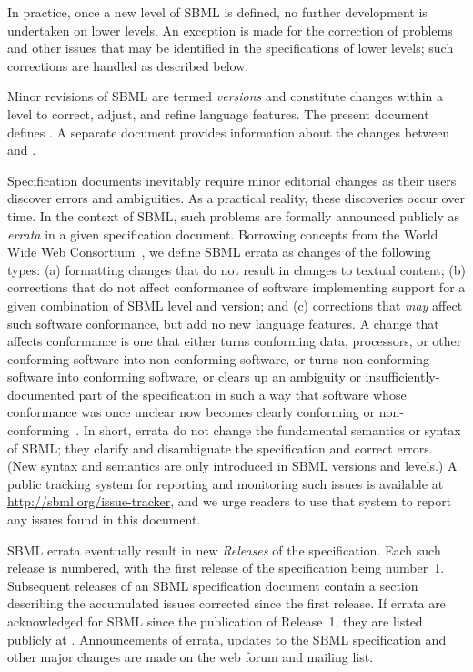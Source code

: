 In practice, once a new level of SBML is defined, no further
development is undertaken on lower levels.  An exception is made
for the correction of problems and other issues that may be
identified in the specifications of lower levels; such corrections
are handled as described below.

Minor revisions of SBML are termed \emph{versions} and constitute
changes within a level to correct, adjust, and refine language
features.  The present document defines \thisL \emph{\thisV}.  A separate
document provides information about the changes between \sbmlthree
and \sbmltwo.

Specification documents inevitably require minor editorial changes
as their users discover errors and ambiguities.  As a practical
reality, these discoveries occur over time.  In the context of
SBML, such problems are formally announced publicly as
\emph{errata} in a given specification document.  Borrowing
concepts from the World Wide Web Consortium~\citep{jacobs:2004},
we define SBML errata as changes of the following types: (a)
formatting changes that do not result in changes to textual
content; (b) corrections that do not affect conformance of
software implementing support for a given combination of SBML
level and version; and (c) corrections that \emph{may} affect such
software conformance, but add no new language features.  A change
that affects conformance is one that either turns conforming data,
processors, or other conforming software into non-conforming
software, or turns non-conforming software into conforming
software, or clears up an ambiguity or insufficiently-documented
part of the specification in such a way that software whose
conformance was once unclear now becomes clearly conforming or
non-conforming~\citep{jacobs:2004}.  In short, errata do not
change the fundamental semantics or syntax of SBML; they clarify
and disambiguate the specification and correct errors.  (New
syntax and semantics are only introduced in SBML versions and
levels.)  A public tracking system for reporting and
monitoring such issues is available at
\url{http://sbml.org/issue-tracker}, and we urge readers to use
that system to report any issues found in this document.

SBML errata eventually result in new \emph{Releases} of the
specification.  Each such release is numbered, with the first
release of the specification being number~1.  Subsequent releases
of an SBML specification document contain a section describing the
accumulated issues corrected since the first release.  If errata
are acknowledged for SBML \thisLV since the publication of
Release~1, they are listed publicly at
.
Announcements of errata, updates to the SBML specification and
other major changes are made on the
web forum and mailing list.

